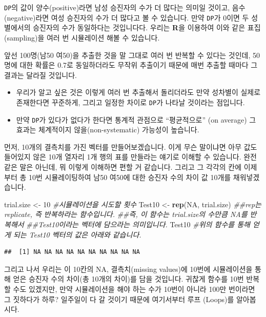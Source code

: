 \documentclass[]{book}
\newenvironment{Shaded}{\begin{snugshade}}{\end{snugshade}}
\newcommand{\CommentTok}[1]{\textcolor[rgb]{0.56,0.35,0.01}{\textit{#1}}}
\newcommand{\DecValTok}[1]{\textcolor[rgb]{0.00,0.00,0.81}{#1}}
\newcommand{\KeywordTok}[1]{\textcolor[rgb]{0.13,0.29,0.53}{\textbf{#1}}}
\newcommand{\NormalTok}[1]{#1}
\newcommand{\OtherTok}[1]{\textcolor[rgb]{0.56,0.35,0.01}{#1}}
\newcommand{\StringTok}[1]{\textcolor[rgb]{0.31,0.60,0.02}{#1}}
\providecommand{\tightlist}{%
  \setlength{\itemsep}{0pt}\setlength{\parskip}{0pt}}
\begin{document}
\texttt{DP}의 값이 양수(positive)라면 남성 승진자의 수가 더 많다는 의미일 것이고, 음수(negative)라면 여성 승진자의 수가 더 많다고 볼 수 있습니다. 만약 \texttt{DP}가 0이면 두 성별에서의 승진자의 수가 동일하다는 것입니다다. 우리는 \textbf{R}을 이용하여 이와 같은 표집(sampling)을 여러 번 시뮬레이션 해볼 수 있습니다.

앞선 100명(남50 여50)을 추출한 것을 말 그대로 여러 번 반복할 수 있다는 것인데, 50명에 대한 확률은 0.7로 동일하더라도 무작위 추출이기 때문에 매번 추출할 때마다 그 결과는 달라질 것입니다.

\begin{itemize}
\tightlist
\item
  우리가 알고 싶은 것은 이렇게 여러 번 추출해서 돌리더라도 만약 성차별이 실제로 존재한다면 꾸준하게, 그리고 일정한 차이로 \texttt{DP}가 나타날 것이라는 점입니다.
\item
  만약 \texttt{DP}가 있다가 없다가 한다면 통계적 관점으로 ``평균적으로'' (on average) 그 효과는 체계적이지 않을(non-systematic) 가능성이 높습니다.
\end{itemize}

먼저, 10개의 결측치를 가진 벡터를 만들어보겠습니다. 이게 무슨 말이냐면 아무 값도 들어있지 않은 10개 열자리 1개 행의 표를 만들라는 얘기로 이해할 수 있습니다. 완전 같은 말은 아닌데, 뭐 이렇게 이해하면 편할 거 같습니다. 그리고 그 각각의 칸에 이제부터 총 10번 시뮬레이팅하여 남50 여50에 대한 승진자 수의 차이 값 10개를 채워넣겠습니다.

\begin{Shaded}
\begin{Highlighting}[]
\NormalTok{trial.size <-}\StringTok{ }\DecValTok{10} \CommentTok{#시뮬레이션을 시도할 횟수}
\NormalTok{Test10 <-}\StringTok{ }\KeywordTok{rep}\NormalTok{(}\OtherTok{NA}\NormalTok{, trial.size) }\CommentTok{##rep는 replicate, 즉 반복하라는 함수입니다.}
                              \CommentTok{##즉, 이 함수는 trial.size의 수만큼 NA를 반복해서}
                              \CommentTok{##Test10이라는 벡터에 담으라는 의미입니다.}
\NormalTok{Test10 }\CommentTok{#위의 함수를 통해 얻게 되는 Test10 벡터의 값은 아래와 같습니다.}
\end{Highlighting}
\end{Shaded}

\begin{verbatim}
##  [1] NA NA NA NA NA NA NA NA NA NA
\end{verbatim}

그리고 나서 우리는 이 10칸의 NA, 결측치(missing values)에 10번에 시뮬레이션을 통해 얻은 승진자 수의 차이(총 10개의 차이)를 담을 것입니다. 귀찮게 함수를 10번 반복할 수도 있겠지만, 만약 시뮬레이션을 해야 하는 수가 10번이 아니라 100만 번이라면 그 짓하다가 하루? 일주일이 다 갈 것이기 때문에 여기서부터 루프 (Loops)를 알아봅시다.
\end{document}
